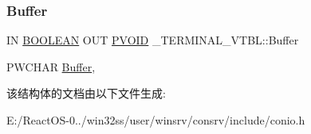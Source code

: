 \subsubsection{\texorpdfstring{Buffer}{Buffer}}
{\footnotesize\ttfamily IN \hyperlink{_processor_bind_8h_a112e3146cb38b6ee95e64d85842e380a}{B\+O\+O\+L\+E\+AN} O\+UT \hyperlink{interfacevoid}{P\+V\+O\+ID} \+\_\+\+T\+E\+R\+M\+I\+N\+A\+L\+\_\+\+V\+T\+B\+L\+::\+Buffer}

P\+W\+C\+H\+AR \hyperlink{class_buffer}{Buffer}, 

该结构体的文档由以下文件生成\+:\begin{DoxyCompactItemize}
\item 
E\+:/\+React\+O\+S-\/0../win32ss/user/winsrv/consrv/include/conio.\+h\end{DoxyCompactItemize}
